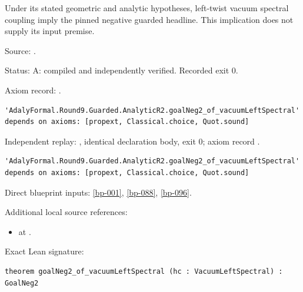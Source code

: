 \begin{theorem}[bp-271]
\label{bp-271}
\leanok
Under its stated geometric and analytic hypotheses, left-twist vacuum spectral coupling imply the pinned negative guarded headline. This implication does not supply its input premise.

\par Source: \texttt{}.
\par Status: A: compiled and independently verified. Recorded exit 0.
\par Axiom record: \texttt{}.
\begin{verbatim}
'AdalyFormal.Round9.Guarded.AnalyticR2.goalNeg2_of_vacuumLeftSpectral' depends on axioms: [propext, Classical.choice, Quot.sound]
\end{verbatim}
\par Independent replay: \texttt{}, identical declaration body, exit 0; axiom record \texttt{}.
\begin{verbatim}
'AdalyFormal.Round9.Guarded.AnalyticR2.goalNeg2_of_vacuumLeftSpectral' depends on axioms: [propext, Classical.choice, Quot.sound]
\end{verbatim}
\par Direct blueprint inputs: \ref{bp-001}, \ref{bp-088}, \ref{bp-096}.
\par Additional local source references:
\begin{itemize}
\item \texttt{} at \texttt{}.
\end{itemize}
\par Exact Lean signature:
\begin{verbatim}
theorem goalNeg2_of_vacuumLeftSpectral (hc : VacuumLeftSpectral) : GoalNeg2
\end{verbatim}
\end{theorem}


